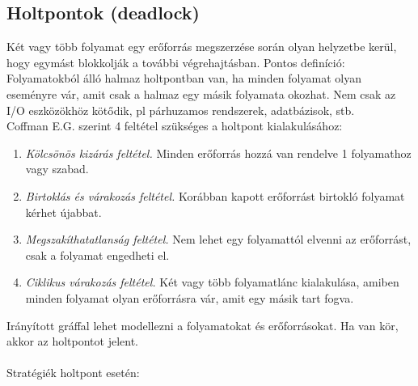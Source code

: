 \documentclass[margin=0px]{article}
\begin{document}
\subsection{Holtpontok (deadlock)}

Két vagy több folyamat egy erőforrás megszerzése során olyan helyzetbe kerül, hogy egymást blokkolják a további végrehajtásban. Pontos definíció: Folyamatokból álló halmaz holtpontban van, ha minden folyamat olyan eseményre vár, amit csak a halmaz egy másik folyamata okozhat. Nem csak az I/O eszközökhöz kötődik, pl párhuzamos rendszerek, adatbázisok, stb. \\
Coffman E.G. szerint 4 feltétel szükséges a holtpont kialakulásához:
\begin{enumerate}
    \item \textit{Kölcsönös kizárás feltétel.} Minden erőforrás hozzá van rendelve 1 folyamathoz vagy szabad.
    \item \textit{Birtoklás és várakozás feltétel.} Korábban kapott erőforrást birtokló folyamat kérhet újabbat.
    \item \textit{Megszakíthatatlanság feltétel.} Nem lehet egy folyamattól elvenni az erőforrást, csak a folyamat engedheti el.
    \item \textit{Ciklikus várakozás feltétel.} Két vagy több folyamatlánc kialakulása, amiben minden folyamat olyan erőforrásra vár, amit egy másik tart fogva.
\end{enumerate}
Irányított gráffal lehet modellezni a folyamatokat és erőforrásokat. Ha van kör, akkor az holtpontot jelent. \\ \\
Stratégiék holtpont esetén:
\end{document}
